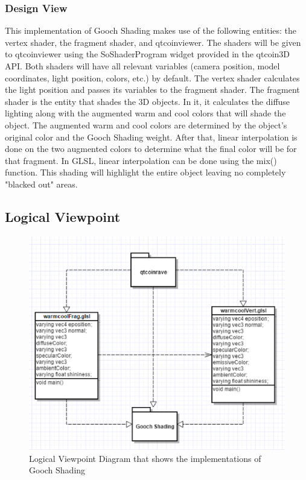 ﻿\documentclass[10pt,journal,compsoc,draftclsnofoot]{IEEEtran}
\begin{document}
\begin{flushleft}
\subsubsection{Design View}
This implementation of Gooch Shading makes use of the following entities: the vertex shader, the fragment shader, and qtcoinviewer.
The shaders will be given to qtcoinviewer using the SoShaderProgram widget provided in the qtcoin3D API.
Both shaders will have all relevant variables (camera position, model coordinates, light position, colors, etc.) by default.
The vertex shader calculates the light position and passes its variables to the fragment shader.
The fragment shader is the entity that shades the 3D objects.
In it, it calculates the diffuse lighting along with the augmented warm and cool colors that will shade the object.
The augmented warm and cool colors are determined by the object's original color and the Gooch Shading weight.
After that, linear interpolation is done on the two augmented colors to determine what the final color will be for that fragment.
In GLSL, linear interpolation can be done using the mix() function.
This shading will highlight the entire object leaving no completely "blacked out" areas.

\newpage

\subsection{Logical Viewpoint}

\begin{figure} [H]
  \includegraphics[scale=0.8]{Gooch_Shading_composition.eps}
  \caption
{ \newline \hspace{\linewidth}
Logical Viewpoint Diagram that shows the implementations of Gooch Shading}
  \label{fig:Gooch_Shading_composition}
\end{figure}


\end{flushleft}
\end{document}
